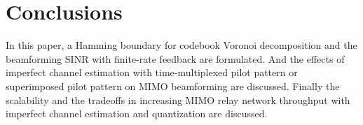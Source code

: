 \documentclass[conference]{IEEEtran}
\begin{document}
\section{Conclusions}
In this paper, a Hamming boundary for codebook Voronoi
decomposition and the beamforming SINR with finite-rate feedback
are formulated. And the effects of imperfect channel estimation
with time-multiplexed pilot pattern or superimposed pilot pattern
on MIMO beamforming are discussed. Finally the scalability and the
tradeoffs in increasing MIMO relay network throughput with
imperfect channel estimation and quantization are discussed.
\small



\end{document}
